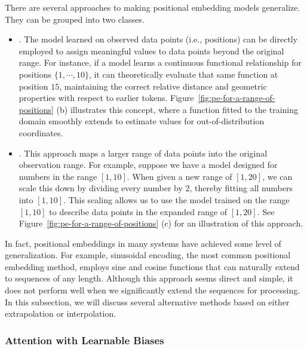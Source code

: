 There are several approaches to making positional embedding models generalize. They can be grouped into two classes.

\begin{itemize}
\item \vspace{0.5em} . The model learned on observed data points (i.e., positions) can be directly employed to assign meaningful values to data points beyond the original range.  For instance, if a model learns a continuous functional relationship for positions $\{1, \cdots, 10\}$, it can theoretically evaluate that same function at position $15$, maintaining the correct relative distance and geometric properties with respect to earlier tokens. Figure~\ref{fig:pe-for-a-range-of-positions} (b) illustrates this concept, where a function fitted to the training domain smoothly extends to estimate values for out-of-distribution coordinates.
\item \vspace{0.3em} . This approach maps a larger range of data points into the original observation range. For example, suppose we have a model designed for numbers in the range $[1,10]$. When given a new range of $[1,20]$, we can scale this down by dividing every number by 2, thereby fitting all numbers into $[1,10]$. This scaling allows us to use the model trained on the range $[1,10]$ to describe data points in the expanded range of $[1,20]$. See Figure~\ref{fig:pe-for-a-range-of-positions} (c) for an illustration of this approach.
\end{itemize}
\vspace{0.5em}

In fact, positional embeddings in many systems have achieved some level of generalization. For example, sinusoidal encoding, the most common positional embedding method, employs sine and cosine functions that can naturally extend to sequences of any length. Although this approach seems direct and simple, it does not perform well when we significantly extend the sequences for processing. In this subsection, we will discuss several alternative methods based on either extrapolation or interpolation.

\subsubsection{Attention with Learnable Biases}

